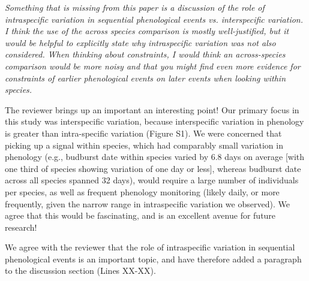 \documentclass[10.95pt,a4paper]{letter}
\begin{document}
\par \emph{Something that is missing from this paper is a discussion of the role of intraspecific variation in sequential phenological events vs. interspecific variation.  I think the use of the across species comparison is mostly well-justified, but it would be helpful to explicitly state why intraspecific variation was not also considered.  When thinking about constraints, I would think an across-species comparison would be more noisy and that you might find even more evidence for constraints of earlier phenological events on later events when looking within species.}
\par The reviewer brings up an important an interesting point! Our primary focus in this study was interspecific variation, because interspecific variation in phenology is greater than intra-specific variation (Figure S1). We were concerned that picking up a signal within species, which had comparably small variation in phenology (e.g., budburst date within species varied by 6.8 days on average [with one third of species showing variation of one day or less], whereas budburst date across all species spanned 32 days), would require a large number of individuals per species, as well as frequent phenology monitoring (likely daily, or more frequently, given the narrow range in intraspecific variation we observed). We agree that this would be fascinating, and is an excellent avenue for future research!
\par We agree with the reviewer that the role of intraspecific variation in sequential phenological events is an important topic, and have therefore added a paragraph to the discussion section (Lines XX-XX).
\end{document}
